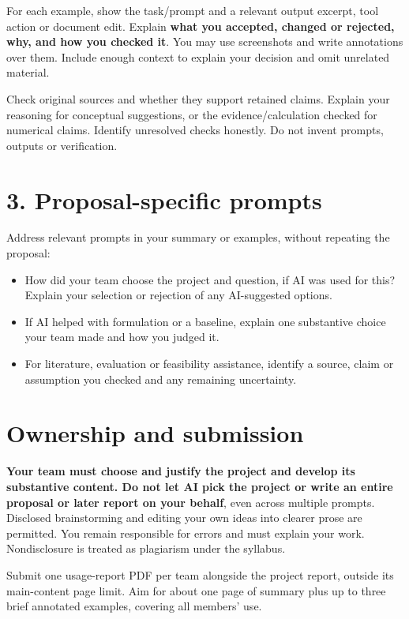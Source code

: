 \documentclass{article}
\begin{document}
For each example, show the task/prompt and a relevant output excerpt, tool action or document edit. Explain \textbf{what you accepted, changed or rejected, why, and how you checked it}. You may use screenshots and write annotations over them. Include enough context to explain your decision and omit unrelated material.

Check original sources and whether they support retained claims. Explain your reasoning for conceptual suggestions, or the evidence/calculation checked for numerical claims. Identify unresolved checks honestly. Do not invent prompts, outputs or verification.

\section*{3. Proposal-specific prompts}
Address relevant prompts in your summary or examples, without repeating the proposal:
\begin{itemize}[leftmargin=*,itemsep=2pt]
\item How did your team choose the project and question, if AI was used for this? Explain your selection or rejection of any AI-suggested options.
\item If AI helped with formulation or a baseline, explain one substantive choice your team made and how you judged it.
\item For literature, evaluation or feasibility assistance, identify a source, claim or assumption you checked and any remaining uncertainty.
\end{itemize}

\section*{Ownership and submission}
\textbf{Your team must choose and justify the project and develop its substantive content. Do not let AI pick the project or write an entire proposal or later report on your behalf}, even across multiple prompts. Disclosed brainstorming and editing your own ideas into clearer prose are permitted. You remain responsible for errors and must explain your work. Nondisclosure is treated as plagiarism under the syllabus.

Submit one usage-report PDF per team alongside the project report, outside its main-content page limit. Aim for about one page of summary plus up to three brief annotated examples, covering all members' use.
\end{document}
